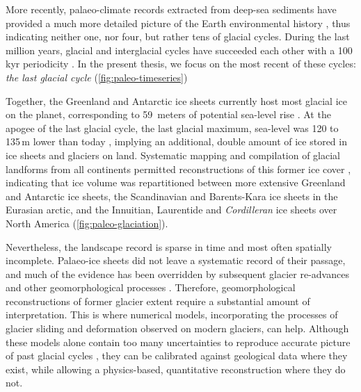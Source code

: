 \documentclass{article}
\begin{document}
More recently, palaeo-climate records extracted from deep-sea sediments have
provided a much more detailed picture of the Earth environmental history
\citep[e.g.,][]{Emiliani.1955, Shackleton.Opdyke.1973}, thus indicating neither
one, nor four, but rather tens of glacial cycles. During the last million
years, glacial and interglacial cycles have succeeded each other with a
100\,kyr periodicity \citep{Hays.etal.1976}. In the present thesis, we focus on
the most recent of these cycles: \emph{the last glacial cycle}
(\cref{fig:paleo-timeseries})

Together, the Greenland and Antarctic ice sheets currently host most glacial
ice on the planet, corresponding to 59~meters of potential sea-level rise
\citep{Bamber.etal.2001, Fretwell.etal.2013}. At the apogee of the last glacial
cycle, the last glacial maximum, sea-level was 120 to 135\,m lower than today
\citep{Clark.Mix.2002}, implying an additional, double amount of ice stored in
ice sheets and glaciers on land. Systematic mapping and compilation of glacial
landforms from all continents permitted reconstructions of this former ice
cover \citep{Ehlers.Gibbard.2007}, indicating that ice volume
was repartitioned between more extensive Greenland and Antarctic ice sheets,
the Scandinavian and Barents-Kara ice sheets in the Eurasian arctic, and the
Innuitian, Laurentide and \emph{Cordilleran} ice sheets over North America
(\cref{fig:paleo-glaciation}).

Nevertheless, the landscape record is sparse in time and most often spatially
incomplete. Palaeo-ice sheets did not leave a systematic record of their
passage, and much of the evidence has been overridden by subsequent glacier
re-advances and other geomorphological processes \citep{Kleman.1994}.
Therefore, geomorphological reconstructions of former glacier extent require a
substantial amount of interpretation. This is where numerical models,
incorporating the processes of glacier sliding \citep[e.g.,][]{Weertman.1957}
and deformation \citep[e.g.,][]{Nye.1953} observed on modern glaciers, can help.
Although these models alone contain too many uncertainties to reproduce
accurate picture of past glacial cycles \citep[e.g.,][]{Hebeler.etal.2008},
they can be calibrated against geological data where they exist, while
allowing a physics-based, quantitative reconstruction where they do not.
\end{document}
